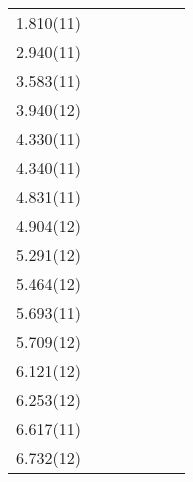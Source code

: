 \begin{center}
\begin{longtable}{cc c cc cc}
    1.810(11)   &       &                   &                   &                   &                   &                   \\
    2.940(11)   &       &                   &                   &                   &                   &                   \\
    3.583(11)   &       &                   &                   &                   &                   &                   \\
    3.940(12)   &       &                   &                   &                   &                   &                   \\
    4.330(11)   &       &                   &                   &                   &                   &                   \\
    4.340(11)   &       &                   &                   &                   &                   &                   \\
    4.831(11)   &       &                   &                   &                   &                   &                   \\
    4.904(12)   &       &                   &                   &                   &                   &                   \\
    5.291(12)   &       &                   &                   &                   &                   &                   \\
    5.464(12)   &       &                   &                   &                   &                   &                   \\
    5.693(11)   &       &                   &                   &                   &                   &                   \\
    5.709(12)   &       &                   &                   &                   &                   &                   \\
    6.121(12)   &       &                   &                   &                   &                   &                   \\
    6.253(12)   &       &                   &                   &                   &                   &                   \\
    6.617(11)   &       &                   &                   &                   &                   &                   \\
    6.732(12)   &       &                   &                   &                   &                   &                   \\

\end{longtable}
\end{center}
